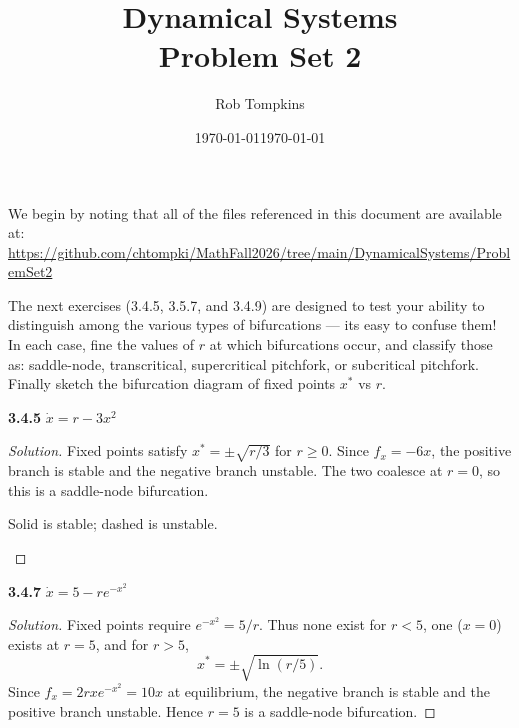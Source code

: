 \documentclass[10pt]{amsart}
\title{Dynamical Systems\\Problem Set 2}
\author{Rob Tompkins}
\date{\today}
\newenvironment{solution}
{\begin{proof}[Solution]}
{\end{proof}}
\begin{document}
    \maketitle
    \date{\today}
    \begin{onehalfspace}
        We begin by noting that all of the files referenced in this document are available at: \\
        \underline{https://github.com/chtompki/MathFall2026/tree/main/DynamicalSystems/ProblemSet2}

        The next exercises (3.4.5, 3.5.7, and 3.4.9) are designed to test your ability to distinguish among the various
        types of bifurcations --- its easy to confuse them!
        In each case, fine the values of $r$ at which bifurcations occur, and classify those as: saddle-node,
        transcritical, supercritical pitchfork, or subcritical pitchfork.
        Finally sketch the bifurcation diagram of fixed points $x^*$ vs $r$.

        \noindent\textbf{3.4.5} $\dot{x} = r - 3x^2$

        \begin{solution}
Fixed points satisfy $x^*=\pm\sqrt{r/3}$ for $r\ge0$. Since $f_x=-6x$, the positive branch is stable and the negative branch unstable. The two coalesce at $r=0$, so this is a saddle-node bifurcation.

\medskip
\begin{center}

\small Solid is stable; dashed is unstable.
\end{center}

\end{solution}

        \noindent\textbf{3.4.7} $\dot{x} = 5 - re^{-x^2}$

        \begin{solution}
Fixed points require $e^{-x^2}=5/r$. Thus none exist for $r<5$, one ($x=0$) exists at $r=5$, and for $r>5$,
\[x^*=\pm\sqrt{\ln(r/5)}.\]
Since $f_x=2rxe^{-x^2}=10x$ at equilibrium, the negative branch is stable and the positive branch unstable. Hence $r=5$ is a saddle-node bifurcation.


\end{solution}
\end{onehalfspace}
\end{document}

